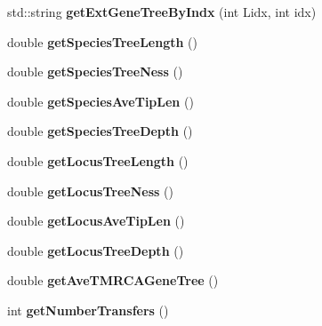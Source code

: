 \begin{DoxyCompactItemize}
\item 
\mbox{\label{class_tree_info_affc153f41343d0918c2807fc8c67eb5c}} 
std\+::string {\bfseries get\+Ext\+Gene\+Tree\+By\+Indx} (int Lidx, int idx)
\item 
\mbox{\label{class_tree_info_a0e982a6a72655a5a944f206c430a0c57}} 
double {\bfseries get\+Species\+Tree\+Length} ()
\item 
\mbox{\label{class_tree_info_a069b1de656460ec6fc34783cde8673c5}} 
double {\bfseries get\+Species\+Tree\+Ness} ()
\item 
\mbox{\label{class_tree_info_ac86de2c3121a4be42c5712aa5b3b051a}} 
double {\bfseries get\+Species\+Ave\+Tip\+Len} ()
\item 
\mbox{\label{class_tree_info_a71f3b4d335251c4580ec10e76d1df4ab}} 
double {\bfseries get\+Species\+Tree\+Depth} ()
\item 
\mbox{\label{class_tree_info_a285d48b8323a922c9968209c18b247ad}} 
double {\bfseries get\+Locus\+Tree\+Length} ()
\item 
\mbox{\label{class_tree_info_ab873c161b24cb69cdcb50f025c25dafa}} 
double {\bfseries get\+Locus\+Tree\+Ness} ()
\item 
\mbox{\label{class_tree_info_a9fcdb36b920fccb30fbb02b5a6bbb678}} 
double {\bfseries get\+Locus\+Ave\+Tip\+Len} ()
\item 
\mbox{\label{class_tree_info_a36472029ec92b19acd503226022e4156}} 
double {\bfseries get\+Locus\+Tree\+Depth} ()
\item 
\mbox{\label{class_tree_info_aa8c36d3bfa92c2a35c7484d91d22b55a}} 
double {\bfseries get\+Ave\+T\+M\+R\+C\+A\+Gene\+Tree} ()
\item 
\mbox{\label{class_tree_info_a36009367ab8b28bdfbdcc08a4f6b9d64}} 
int {\bfseries get\+Number\+Transfers} ()
\item 
\mbox{\label{class_tree_info_a7fe6c510d153e8fab3a64f441da37d49}} 

\end{DoxyCompactItemize}
